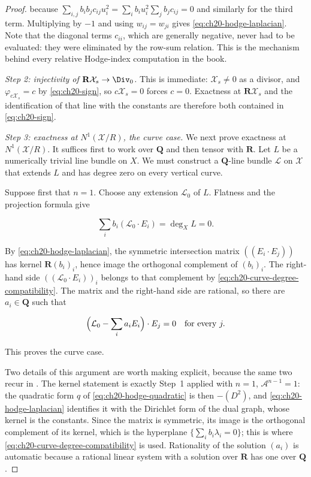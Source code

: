 \begin{proof}
because $\sum_{i,j}b_ib_jc_{ij}u_i^2=\sum_ib_iu_i^2\sum_jb_jc_{ij}=0$ and
similarly for the third term.  Multiplying by $-1$ and using
$w_{ij}=w_{ji}$ gives \eqref{eq:ch20-hodge-laplacian}.  Note that the
diagonal terms $c_{ii}$, which are generally negative, never had to be
evaluated: they were eliminated by the row-sum relation.  This is the
mechanism behind every relative Hodge-index computation in the book.

\emph{Step 2: injectivity of $\mathbf R\mathcal X_s\to\Div_0$.}
This is immediate: $\mathcal X_s\neq0$ as a divisor, and
$\varphi_{c\mathcal X_s}=c$ by \eqref{eq:ch20-sign}, so
$c\mathcal X_s=0$ forces $c=0$.  Exactness at
$\mathbf R\mathcal X_s$ and the identification of that line with the
constants are therefore both contained in \eqref{eq:ch20-sign}.

\emph{Step 3: exactness at $N^1(\mathcal X/R)$, the curve case.}
We next prove exactness at $N^1(\mathcal X/R)$.  It suffices first to work
over $\mathbf Q$ and then tensor with $\mathbf R$.  Let $L$ be a
numerically trivial line bundle on $X$.  We must construct a
$\mathbf Q$-line bundle $\mathcal L$ on $\mathcal X$ that extends
$L$ and has degree zero on every vertical curve.

Suppose first that $n=1$.  Choose any extension $\mathcal L_0$ of
$L$.  Flatness and the projection formula give

\begin{equation}
\label{eq:ch20-curve-degree-compatibility}
          \sum_i b_i(\mathcal L_0\cdot E_i)=\deg_X L=0.
\end{equation}

By \eqref{eq:ch20-hodge-laplacian}, the symmetric intersection matrix
$((E_i\cdot E_j))$ has kernel $\mathbf R(b_i)_i$, hence image the
orthogonal complement of $(b_i)_i$.  The right-hand side
$((\mathcal L_0\cdot E_i))_i$ belongs to that complement by
\eqref{eq:ch20-curve-degree-compatibility}.  The matrix and the right-hand
side are rational, so there are $a_i\in\mathbf Q$ such that

\begin{equation}
\label{eq:ch20-curve-vertical-correction}
          \Bigl(\mathcal L_0-\sum_i a_iE_i\Bigr)\cdot E_j=0
          \quad\text{for every }j.
\end{equation}

This proves the curve case.

Two details of this argument are worth making explicit, because the same
two recur in .  The kernel statement is exactly
Step~1 applied with $n=1$, $\mathcal A^{n-1}=1$: the quadratic form
$q$ of \eqref{eq:ch20-hodge-quadratic} is then
$-(D^2)$, and \eqref{eq:ch20-hodge-laplacian} identifies it with the
Dirichlet form of the dual graph, whose kernel is the constants.  Since the
matrix is symmetric, its image is the orthogonal complement of its kernel,
which is the hyperplane $\{\sum_ib_i\lambda_i=0\}$; this is where
\eqref{eq:ch20-curve-degree-compatibility} is used.  Rationality of the
solution $(a_i)$ is automatic because a rational linear system with a
solution over $\mathbf R$ has one over $\mathbf Q$.


\end{proof}
